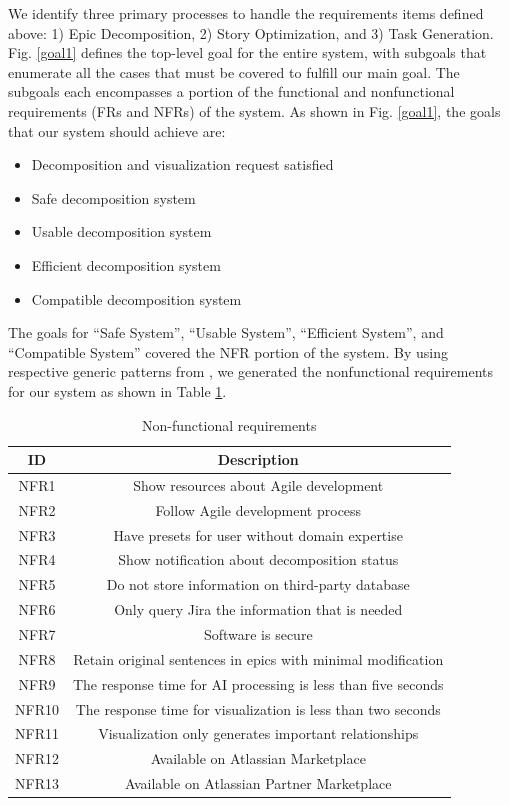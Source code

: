 We identify three primary processes to handle the requirements items defined above: 1) Epic Decomposition, 2) Story Optimization, and 3) Task Generation. Fig. \ref{goal1} defines the top-level goal for the entire system, with subgoals that enumerate all the cases that must be covered to fulfill our main goal. The subgoals each encompasses a portion of the functional and nonfunctional requirements (FRs and NFRs) of the system. As shown in Fig. \ref{goal1}, the goals that our system should achieve are:

\begin{itemize}
	\item Decomposition and visualization request satisfied
	\item Safe decomposition system
	\item Usable decomposition system
	\item Efficient decomposition system
	\item Compatible decomposition system
\end{itemize}

The goals for “Safe System”, “Usable System”, “Efficient System”, and “Compatible System” covered the NFR portion of the system. By using respective generic patterns from \cite{KAOS}, we generated the nonfunctional requirements for our system as shown in Table \ref{nfrs}.

\begin{table}
\centering
\caption{Non-functional requirements}
\label{nfrs}
\begin{tabular}{ |c|c| } 
\hline
\multicolumn{1}{|c|}{\textbf{ID}} & \multicolumn{1}{c|}{\textbf{Description}} \\
\hline
NFR1 & Show resources about Agile development \\
\hline
NFR2 & Follow Agile development process \\
\hline
NFR3 & Have presets for user without domain expertise \\
\hline
NFR4 & Show notification about decomposition status \\
\hline
NFR5 & Do not store information on third-party database \\
\hline
NFR6 & Only query Jira the information that is needed \\
\hline
NFR7 & Software is secure \\
\hline
NFR8 & Retain original sentences in epics with minimal modification \\
\hline
NFR9 & The response time for AI processing is less than five seconds \\
\hline
NFR10 & The response time for visualization is less than two seconds \\
\hline
NFR11 & Visualization only generates important relationships \\
\hline
NFR12 & Available on Atlassian Marketplace \\
\hline
NFR13 & Available on Atlassian Partner Marketplace \\
\hline
\end{tabular}
\end{table}

